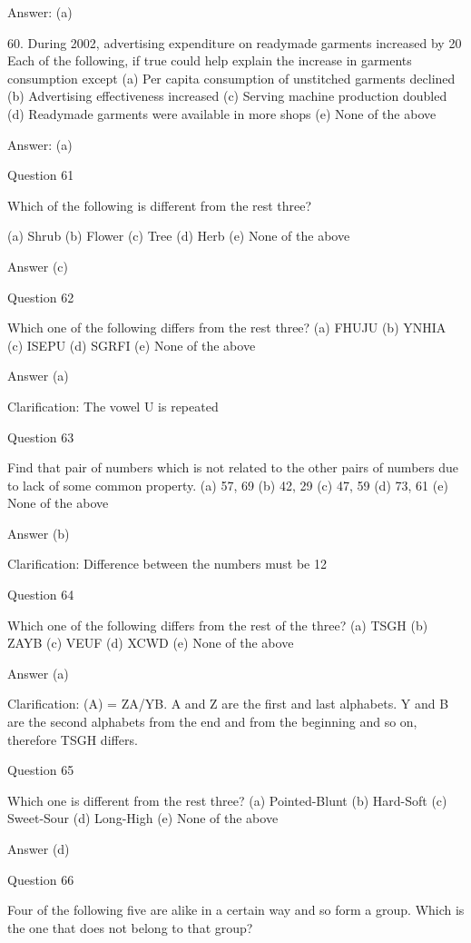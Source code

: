 Answer: (a)

60. During 2002, advertising expenditure on readymade garments increased by 20%
Each of the following, if true could help explain the increase in garments consumption except (a) Per capita consumption of unstitched garments declined
(b) Advertising effectiveness increased
(c) Serving machine production doubled
(d) Readymade garments were available in more shops
(e) None of the above

Answer: (a)


Question 61

Which of the following is different from the rest three?

(a) Shrub
(b) Flower
(c) Tree
(d) Herb
(e) None of the above

Answer (c)

Question 62

Which one of the following differs from the rest three?
(a) FHUJU
(b) YNHIA
(c) ISEPU
(d) SGRFI
(e) None of the above

Answer (a)

Clarification: The vowel U is repeated

Question 63

Find that pair of numbers which is not related to the other pairs of numbers due to lack of some common property.
(a) 57, 69
(b) 42, 29
(c) 47, 59
(d) 73, 61
(e) None of the above

Answer (b)

Clarification: Difference between the numbers must be 12

Question 64

Which one of the following differs from the rest of the three?
(a) TSGH
(b) ZAYB
(c) VEUF
(d) XCWD
(e) None of the above

Answer (a)

Clarification: (A) = ZA/YB. A and Z are the first and last alphabets. Y and B are the second alphabets from the end and from the beginning and so on, therefore TSGH differs.

Question 65

Which one is different from the rest three?
(a) Pointed-Blunt
(b) Hard-Soft
(c) Sweet-Sour
(d) Long-High
(e) None of the above

Answer (d)


Question 66

Four of the following five are alike in a certain way and so form a group. Which is the one that does not belong to that group?

